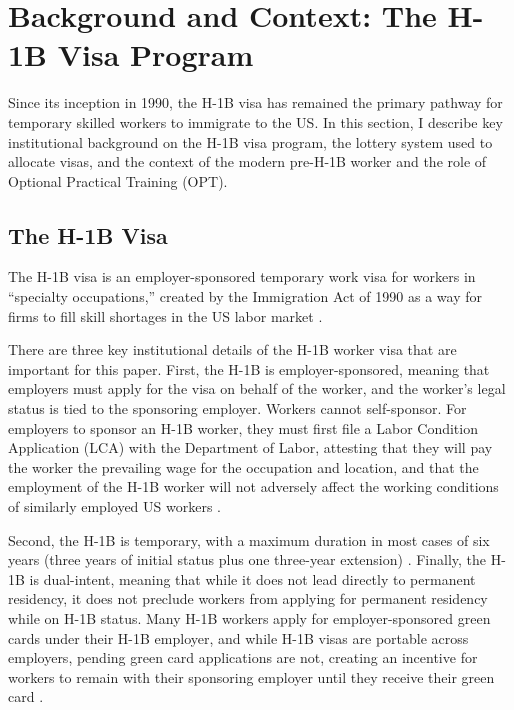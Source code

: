 \section{Background and Context: The H-1B Visa Program}

Since its inception in 1990, the H-1B visa has remained the primary pathway for temporary skilled workers to immigrate to the US. In this section, I describe key institutional background on the H-1B visa program, the lottery system used to allocate visas, and the context of the modern pre-H-1B worker and the role of Optional Practical Training (OPT).



\subsection{The H-1B Visa}
The H-1B visa is an employer-sponsored temporary work visa for workers in ``specialty occupations,'' created by the Immigration Act of 1990 as a way for firms to fill skill shortages in the US labor market \citep{uscis_h1b_specialty_2026}.

There are three key institutional details of the H-1B worker visa that are important for this paper. First, the H-1B is employer-sponsored, meaning that employers must apply for the visa on behalf of the worker, and the worker's legal status is tied to the sponsoring employer. Workers cannot self-sponsor. For employers to sponsor an H-1B worker, they must first file a Labor Condition Application (LCA) with the Department of Labor, attesting that they will pay the worker the prevailing wage for the occupation and location, and that the employment of the H-1B worker will not adversely affect the working conditions of similarly employed US workers \citep{dol_h1b_lca}.

Second, the H-1B is temporary, with a maximum duration in most cases of six years (three years of initial status plus one three-year extension) \citep{uscis_h1b_specialty_2026}.
Finally, the H-1B is dual-intent, meaning that while it does not lead directly to permanent residency, it does not preclude workers from applying for permanent residency while on H-1B status.
Many H-1B workers apply for employer-sponsored green cards under their H-1B employer, and while H-1B visas are portable across employers, pending green card applications are not, creating an incentive for workers to remain with their sponsoring employer until they receive their green card \citep{kimpei2022}.

